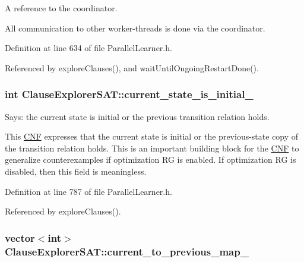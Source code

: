A reference to the coordinator. 

All communication to other worker-\/threads is done via the coordinator. 

Definition at line 634 of file Parallel\-Learner.\-h.



Referenced by explore\-Clauses(), and wait\-Until\-Ongoing\-Restart\-Done().

\hypertarget{classClauseExplorerSAT_a210b4a062e0a949536b172d904a2219f}{
\subsubsection[{current\-\_\-state\-\_\-is\-\_\-initial\-\_\-}]{\setlength{\rightskip}{0pt plus 5cm}int Clause\-Explorer\-S\-A\-T\-::current\-\_\-state\-\_\-is\-\_\-initial\-\_\-\hspace{0.3cm}{\ttfamily [protected]}}}\label{classClauseExplorerSAT_a210b4a062e0a949536b172d904a2219f}


Says\-: the current state is initial or the previous transition relation holds. 

This \hyperlink{classCNF}{C\-N\-F} expresses that the current state is initial or the previous-\/state copy of the transition relation holds. This is an important building block for the \hyperlink{classCNF}{C\-N\-F} to generalize counterexamples if optimization R\-G is enabled. If optimization R\-G is disabled, then this field is meaningless. 

Definition at line 787 of file Parallel\-Learner.\-h.



Referenced by explore\-Clauses().

\hypertarget{classClauseExplorerSAT_aecf42678820d41d716fb23f833066da2}{
\subsubsection[{current\-\_\-to\-\_\-previous\-\_\-map\-\_\-}]{\setlength{\rightskip}{0pt plus 5cm}vector$<$int$>$ Clause\-Explorer\-S\-A\-T\-::current\-\_\-to\-\_\-previous\-\_\-map\-\_\-\hspace{0.3cm}{\ttfamily [protected]}}}\label{classClauseExplorerSAT_aecf42678820d41d716fb23f833066da2}


